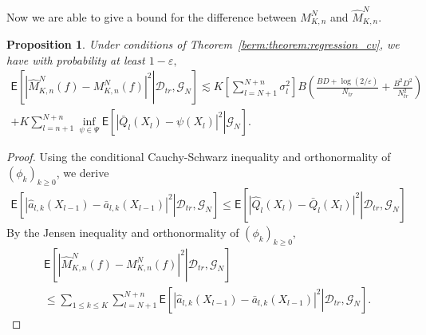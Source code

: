 \documentclass[article]{elsarticle}
\newtheorem{prop}[thm]{Proposition}
\begin{document}
Now we are able to give  a bound for the difference between \( M_{K,n}^N\) and \(\widehat M_{K,n}^N.\)
\begin{prop}
\label{cor:dif_m}
Under  conditions of Theorem~\ref{berm:theorem:regression_cv}, we have with probability at least \(1-\varepsilon,\)
\begin{multline}
\label{eq:main_bound}
\mathsf{E}\left[\left.\left|\widehat{M}_{K,n}^{N}(f)-M_{K,n}^{N}(f)\right|^{2}\right | \mathcal{D}_{tr},\mathcal{G}_N\right]\lesssim  K\left[\sum_{l=N+1}^{N+n} \sigma^2_l \right]B
\left(\frac{BD+\log(2/\varepsilon)}{N_{tr}}+\frac{B^2D^2}{N_{tr}^2}\right)
\\
+
K \sum_{l=n+1}^{N+n}\inf_{\psi\in \Psi}
\mathsf{E}\left[\left.\left|\bar Q_l(X_{l})-\psi(X_{l})\right|^{2}\right | \mathcal{G}_N \right].
\end{multline}
\end{prop}
\begin{proof}
Using the conditional Cauchy-Schwarz inequality and  orthonormality of \((\phi_k)_{k\geq 0}\), we derive
\begin{eqnarray*}
\mathsf{E}\left[\left.\left|\widehat{a}_{l,k}(X_{l-1})-\bar a_{l,k}(X_{l-1})\right|^{2}\right | \mathcal{D}_{tr}, \mathcal{G}_N\right]\leq\mathsf{E}\left[\left.\left|\widehat{Q}_{l}\left(X_{l}\right)-\bar Q_{l}\left(X_{l}\right)\right|^{2}\right | \mathcal{D}_{tr}, \mathcal{G}_N\right]
\end{eqnarray*}
By the Jensen inequality and orthonormality of \((\phi_k)_{k\geq 0},\)
\begin{multline*}
\mathsf{E}\left[\left.\left|\widehat{M}_{K,n}^{N}(f)-M_{K,n}^{N}(f)\right|^{2}\right | \mathcal{D}_{tr}, \mathcal{G}_N\right]
\\
\leq \sum_{1\leq k\le K}\sum_{l=N+1}^{N+n}\mathsf{E}\left[\left.\left|\widehat{a}_{l,k}(X_{l-1})-\bar a_{l,k}(X_{l-1})\right|^{2}\right | \mathcal{D}_{tr}, \mathcal{G}_N\right].
\end{multline*}
\end{proof}
\end{document}
